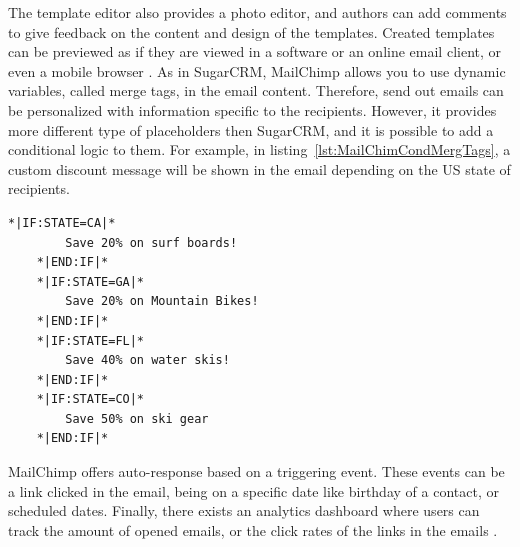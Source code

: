 The template editor also provides a photo editor, and authors can add comments to give feedback on the content and design of the templates. Created templates can be previewed as if they are viewed in a software or an online email client, or even a mobile browser \citep{TheRocketScienceGroupLLC2013a}. As in SugarCRM, MailChimp allows you to use dynamic variables, called merge tags, in the email content. Therefore, send out emails can be personalized with information specific to the recipients. However, it provides more different type of placeholders then SugarCRM, and it is possible to add a conditional logic to them. For example, in listing~\ref{lst:MailChimCondMergTags}, a custom discount message will be shown in the email depending on the US state of recipients.
\vspace{1cm}


\begin{lstlisting}[language=XML, caption={[MailChimp's Conditional Merge Tags]MailChimp's Conditional Merge Tags \citep{TheRocketScienceGroupLLC2013b}}, label={lst:MailChimCondMergTags}]
	*|IF:STATE=CA|*
		Save 20% on surf boards!
	*|END:IF|* 
	*|IF:STATE=GA|*
		Save 20% on Mountain Bikes!
	*|END:IF|* 
	*|IF:STATE=FL|*
		Save 40% on water skis!
	*|END:IF|* 
	*|IF:STATE=CO|*
		Save 50% on ski gear
	*|END:IF|*
\end{lstlisting}

MailChimp offers auto-response based on a triggering event. These events can be a link clicked in the email, being on a specific date like birthday of a contact, or scheduled dates. Finally, there exists an analytics dashboard where users can track the amount of opened emails, or the click rates of the links in the emails \citep{TheRocketScienceGroupLLC2013c,TheRocketScienceGroupLLC2013d,TheRocketScienceGroupLLC2013e}.

